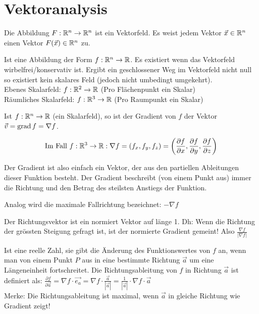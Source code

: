 \section{Vektoranalysis}
\begin{definition}[Vektorfeld]
Die Abbildung $F: \mathbb{R}^n \to \mathbb{R}^n$ ist ein Vektorfeld. Es weist jedem
Vektor $\vec{x} \in \mathbb{R}^n$ einen Vektor $F(\vec{x}) \in \mathbb{R}^n$ zu.
\end{definition}

\begin{definition}[Skalarfeld]
Ist eine Abbildung der Form $f: \mathbb{R}^n \to \mathbb{R}$. Es existiert wenn das Vektorfeld wirbelfrei/konservativ ist. Ergibt ein geschlossener Weg im Vektorfeld nicht null so existiert kein skalares Feld (jedoch nicht umbedingt umgekehrt).\\
Ebenes Skalarfeld: $f: \mathbb{R}^2 \to \mathbb{R}$ (Pro Flächenpunkt ein Skalar)\\
Räumliches Skalarfeld: $f: \mathbb{R}^3 \to \mathbb{R}$ (Pro Raumpunkt ein Skalar)
\end{definition}

\begin{definition}[Gradient]
Ist $f: \mathbb{R}^n \to \mathbb{R}$ (ein Skalarfeld), so ist der Gradient von $f$ der Vektor
$\vec{v} = \operatorname{grad} f = \nabla f$. 

\[
	\text{Im Fall } f: \mathbb{R}^3 \to \mathbb{R}:   \nabla f = (f_x, f_y, f_z) =
	\left( \frac{\partial f}{\partial x}, \frac{\partial f}{\partial y}, \frac{\partial f}{\partial z} \right)
\]

Der Gradient ist also einfach ein Vektor, der aus den partiellen Ableitungen dieser Funktion besteht. Der Gradient beschreibt (von einem Punkt aus) immer die Richtung und den Betrag des steilsten Anstiegs der Funktion. 

Analog wird die maximale Fallrichtung bezeichnet: $- \nabla f$
\end{definition}

\begin{definition}[Richtungsvektor] Der Richtungsvektor ist ein normiert Vektor auf länge 1. Dh: Wenn die Richtung der grössten Steigung gefragt ist, ist der normierte Gradient gemeint! Also $\frac{\nabla f}{|\nabla f|}$
\end{definition}

\begin{definition}[Richtungsableitung]
Ist eine reelle Zahl, sie gibt die Änderung des Funktionswertes von $f$ an, wenn man von einem Punkt $P$ aus in eine bestimmte Richtung $\vec{a}$ um eine Längeneinheit fortschreitet. Die Richtungsableitung von $f$ in Richtung $\vec{a}$ ist definiert als: 
$\frac{\partial f}{\partial \vec{a}} = \nabla f \cdot \vec{e_a} = \nabla f \cdot \frac{\vec{a}}{|\vec{a}|} = \frac{1}{|\vec{a}|} \cdot \nabla f \cdot \vec{a}$\\
Merke: Die Richtungsableitung ist maximal, wenn $\vec{a}$ in gleiche Richtung wie Gradient zeigt!
\end{definition}


